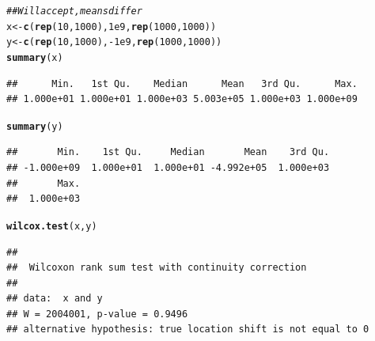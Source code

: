 \documentclass{config/apuntes}\usepackage[]{graphicx}\usepackage[]{xcolor}
\makeatletter
\newcommand{\hlnum}[1]{\textcolor[rgb]{0.686,0.059,0.569}{#1}}%
\newcommand{\hlcom}[1]{\textcolor[rgb]{0.678,0.584,0.686}{\textit{#1}}}%
\newcommand{\hlopt}[1]{\textcolor[rgb]{0,0,0}{#1}}%
\newcommand{\hldef}[1]{\textcolor[rgb]{0.345,0.345,0.345}{#1}}%
\newcommand{\hlkwb}[1]{\textcolor[rgb]{0.69,0.353,0.396}{#1}}%
\newcommand{\hlkwd}[1]{\textcolor[rgb]{0.737,0.353,0.396}{\textbf{#1}}}%
\newenvironment{kframe}{%
 \def\at@end@of@kframe{}%
 \ifinner\ifhmode%
  \def\at@end@of@kframe{\end{minipage}}%
  \begin{minipage}{\columnwidth}%
 \fi\fi%
 \def\FrameCommand##1{\hskip\@totalleftmargin \hskip-\fboxsep
 \colorbox{shadecolor}{##1}\hskip-\fboxsep
     \hskip-\linewidth \hskip-\@totalleftmargin \hskip\columnwidth}%
 \MakeFramed {\advance\hsize-\width
   \@totalleftmargin\z@ \linewidth\hsize
   \@setminipage}}%
 {\par\unskip\endMakeFramed%
 \at@end@of@kframe}
\newenvironment{knitrout}{}{} %
\makeatother
\begin{document}
\begin{knitrout}
\color{fgcolor}\begin{kframe}
\begin{alltt}
\hlcom{## Will accept, means differ}
\hldef{x} \hlkwb{<-} \hlkwd{c}\hldef{(}\hlkwd{rep}\hldef{(}\hlnum{10}\hldef{,} \hlnum{1000}\hldef{),} \hlnum{1e9}\hldef{,} \hlkwd{rep}\hldef{(}\hlnum{1000}\hldef{,} \hlnum{1000}\hldef{))}
\hldef{y} \hlkwb{<-} \hlkwd{c}\hldef{(}\hlkwd{rep}\hldef{(}\hlnum{10}\hldef{,} \hlnum{1000}\hldef{),} \hlopt{-}\hlnum{1e9}\hldef{,} \hlkwd{rep}\hldef{(}\hlnum{1000}\hldef{,} \hlnum{1000}\hldef{))}
\hlkwd{summary}\hldef{(x)}
\end{alltt}
\begin{verbatim}
##      Min.   1st Qu.    Median      Mean   3rd Qu.      Max. 
## 1.000e+01 1.000e+01 1.000e+03 5.003e+05 1.000e+03 1.000e+09
\end{verbatim}
\begin{alltt}
\hlkwd{summary}\hldef{(y)}
\end{alltt}
\begin{verbatim}
##       Min.    1st Qu.     Median       Mean    3rd Qu. 
## -1.000e+09  1.000e+01  1.000e+01 -4.992e+05  1.000e+03 
##       Max. 
##  1.000e+03
\end{verbatim}
\begin{alltt}
\hlkwd{wilcox.test}\hldef{(x, y)}
\end{alltt}
\begin{verbatim}
## 
## 	Wilcoxon rank sum test with continuity correction
## 
## data:  x and y
## W = 2004001, p-value = 0.9496
## alternative hypothesis: true location shift is not equal to 0
\end{verbatim}
\end{kframe}
\end{knitrout}
\end{document}
